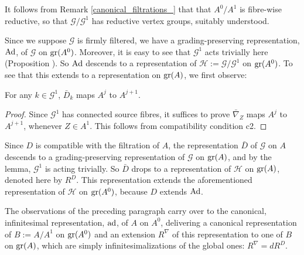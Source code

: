 \documentclass[leqno,12pt]{amsart} %
\begin{document}
\begin{remark}
  It follows from Remark \ref{canonical_filtrations_} that that $A^0/A^1$ is fibre-wise
  reductive, so that ${\mathcal G}/{\mathcal G}^1$ has reductive vertex groups, suitably
  understood.
\end{remark}

Since we suppose ${\mathcal G} $ is firmly filtered, we have a grading-preserving
representation, $\operatorname{Ad}$, of ${\mathcal G} $ on $\operatorname{\operatorname{gr}}(A^0)$.  Moreover, it is easy to
see that ${\mathcal G}^1$ acts trivially here (Proposition ).  So
$\operatorname{Ad}$ descends to a representation of ${\mathcal H} := {\mathcal G}/{\mathcal G}^1$
on $\operatorname{\operatorname{gr}}(A^0)$. To see that this extends to a representation on $\operatorname{\operatorname{gr}}(A)$, we first
observe:

\begin{lemma}
  For any $ k \in {\mathcal G}^1$, $\bar D_k$ maps $A^j$ to $A^{j+1}$.
\end{lemma}

\begin{proof}
  Since ${\mathcal G}^1$ has connected source fibres, it suffices to prove $\bar\nabla_Z$
  maps $A^j$ to $A^{j+1}$, whenever $Z \in A^1$. This follows from compatibility condition
  c2.
\end{proof}

Since $D$ is compatible with the filtration of $A$, the representation $\bar D$ of
${\mathcal G} $ on $A$ descends to a grading-preserving representation of ${\mathcal G} $
on $\operatorname{\operatorname{gr}}(A)$, and by the lemma, ${\mathcal G}^1$ is acting trivially. So $\bar D$ drops
to a representation of ${\mathcal H} $ on $\operatorname{\operatorname{gr}}(A)$, denoted here by $R^D$. This
representation extends the aforementioned representation of ${\mathcal H} $ on
$\operatorname{\operatorname{gr}}(A^0)$, because $D$ extends $\operatorname{Ad}$.

The observations of the preceding paragraph carry over to the canonical, infinitesimal
representation, $\operatorname{ad}$, of $A$ on $A^0$, delivering a canonical representation of
$B := A/A^1$ on $\operatorname{\operatorname{gr}}(A^0)$ and an extension $R^\nabla $ of this representation to one
of $B$ on $\operatorname{\operatorname{gr}}(A)$, which are simply infinitesimalizations of the global ones:
$R^\nabla =dR^D$.
\end{document}
